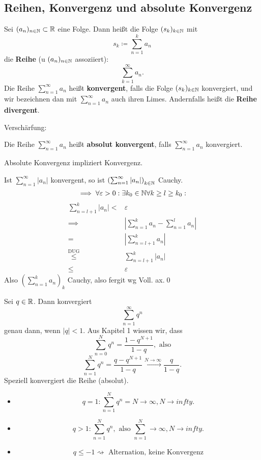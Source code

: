 \documentclass[consecutivenumbering]{gadsescript}
\begin{document}
\subsection{Reihen, Konvergenz und absolute Konvergenz}
\begin{subdefinition}
	Sei $ (a_n)_{n\in\mathbb{N}} \subset \mathbb{R} $ eine Folge. Dann heißt die Folge $ (s_k)_{k\in\mathbb{N}} $ mit
	\[ s_k \coloneqq \sum_{n = 1}^{k} a_n \]
	die \textbf{Reihe} (u $ (a_n)_{n\in\mathbb{N}} $ assoziiert):
	\[ \sum_{k=1}^{\infty} a_n. \]
	Die Reihe $ \sum_{n = 1}^{\infty} a_n $ heißt \textbf{konvergent}, falls die Folge $ (s_k)_{k\in\mathbb{N}} $ konvergiert, und wir bezeichnen dan mit $ \sum_{n=1}^{\infty} a_n $ auch ihren Limes. Andernfalls heißt die \textbf{Reihe divergent}.
\end{subdefinition}
Verschärfung:
\begin{subdefinition}
	Die Reihe $ \sum_{n = 1}^{\infty} a_n $ heißt \textbf{absolut konvergent}, falls $ \sum_{n=1}^{\infty} a_n $ konvergiert.
\end{subdefinition}
\begin{sublemma}
	Absolute Konvergenz impliziert Konvergenz.
	\begin{subproof*}
		Ist $ \sum_{n=1}^{\infty}|a_n| $ konvergent, so ist $ \left( \sum_{n=1}^{\infty}|a_n| \right)_{k\in\mathbb{N}} $ Cauchy.
		\[ \implies \forall \varepsilon > 0 : \exists k_0 \in \mathbb{N} \forall k \geq l \geq k_0 :\]
		\begin{align*}
			\sum_{n=l+1}^{k}|a_n| < &\varepsilon\\
			\implies &\left| \sum_{n=1}^{k}a_n - \sum_{n=1}^{l}a_n \right|\\
			= &\left| \sum_{n = l+1}^{k} a_n \right|\\
			\overset{\text{DUG}}{\leq} &\sum_{n=l+1}^{k} |a_n|\\
			\leq &\varepsilon
		\end{align*}
		Also $ \left(\sum_{n=1}^{k} a_n \right)_k $ Cauchy, also fergit wg Voll. ax.\qed
	\end{subproof*}
\end{sublemma}
\begin{subexample}
	Sei $ q \in \mathbb{R} $. Dann konvergiert
	\[ \sum_{n=1}^{\infty} q^n \]
	genau dann, wenn $ | q | < 1 $. Aus Kapitel 1 wissen wir, dass
	\[ \sum_{n=0}^{N} q^n = \frac{1 - q^{N+1}}{1 - q}, \text{ also} \]
	\[ \sum_{n=1}^{N} q^n = \frac{q - q^{N+1}}{1 - q} \overset{N\to\infty}{\to} \frac{q}{1-q}. \]
	Speziell konvergiert die Reihe (absolut).
	\begin{itemize}
		\item \[ q=1: \sum_{n=1}^{N} q^n = N \to \infty, N \to infty. \]
		\item \[ q>1: \sum_{n=1}^{N} q^n, \text{ also } \sum_{n=1}^{N} \to \infty, N \to infty. \]
		\item \[ q\leq-1 \rightsquigarrow \text{ Alternation, keine Konvergenz} \]
	\end{itemize}
\end{subexample}
\end{document}
